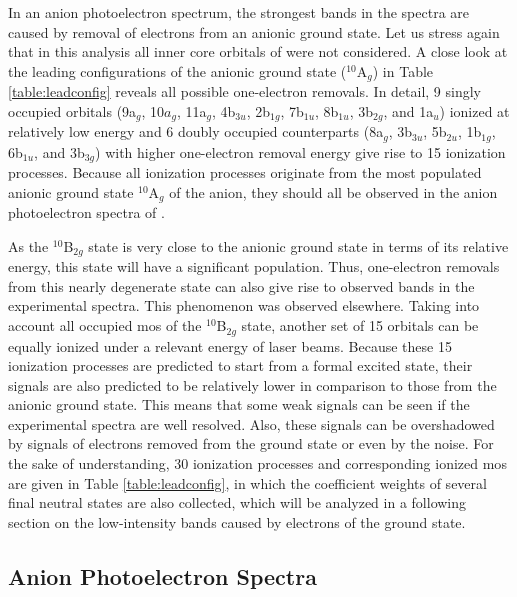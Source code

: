 \begin{refsection}
In an anion photoelectron spectrum, the strongest bands in the spectra are caused by removal of electrons from an anionic ground state. Let us stress again that in this analysis all inner core orbitals of  were not considered. A close look at the leading configurations of the anionic ground state ($^{10}$A$_g$) in Table \ref{table:leadconfig} reveals all possible one-electron removals. In detail, 9 singly occupied orbitals (9a$_g$, 10$a_g$, 11a$_g$, 4b$_{3u}$, 2b$_{1g}$, 7b$_{1u}$, 8b$_{1u}$, 3b$_{2g}$, and 1a$_u$) ionized at relatively low energy and 6 doubly occupied counterparts (8a$_g$, 3b$_{3u}$, 5b$_{2u}$, 1b$_{1g}$, 6b$_{1u}$, and 3b$_{3g}$) with higher one-electron removal energy give rise to 15 ionization processes. Because all ionization processes originate from the most populated anionic ground state $^{10}$A$_g$ of the anion, they should all be observed in the anion photoelectron spectra of . 





As the $^{10}$B$_{2g}$ state is very close to the anionic ground state in terms of its relative energy, this state will have a significant population. Thus, one-electron removals from this nearly degenerate state can also give rise to observed bands in the experimental spectra. This phenomenon was observed elsewhere. \cite{Nhan-vc2, Nhan-tige2} Taking into account all occupied \acrshort{mo}s of the $^{10}$B$_{2g}$ state, another set of 15 orbitals can be equally ionized under a relevant energy of laser beams. Because these 15 ionization processes are predicted to start from a formal excited state, their signals are also predicted to be relatively lower in comparison to those from the anionic ground state. This means that some weak signals can be seen if the experimental spectra are well resolved. Also, these signals can be overshadowed by signals of electrons removed from the ground state or even by the noise. For the sake of understanding, 30 ionization processes and corresponding ionized \acrshort{mo}s are given in Table \ref{table:leadconfig}, in which the coefficient weights of several final neutral states are also collected, which will be analyzed in a following section on the low-intensity bands caused by electrons of the ground state. 




\subsection{Anion Photoelectron Spectra}


\end{refsection}
